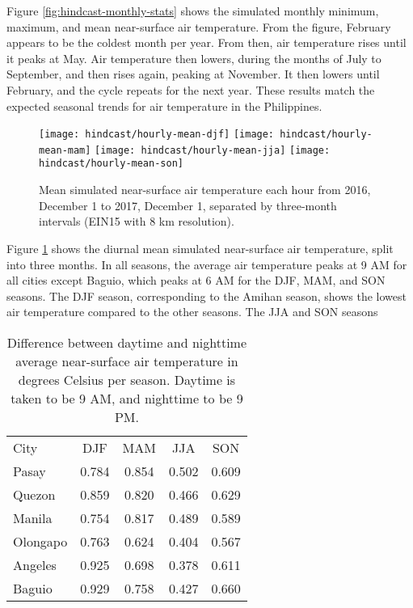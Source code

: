		Figure \ref{fig:hindcast-monthly-stats} shows the simulated monthly minimum, maximum, and mean near-surface air temperature.
		From the figure, February appears to be the coldest month per year.
		From then, air temperature rises until it peaks at May.
		Air temperature then lowers, during the months of July to September,
			and then rises again, peaking at November.
		It then lowers until February, and the cycle repeats for the next year.
		These results match the expected seasonal trends for air temperature in the Philippines.
	
		\begin{figure}	
			\centering
			\texttt{[image: hindcast/hourly-mean-djf]}
			\texttt{[image: hindcast/hourly-mean-mam]}
			\texttt{[image: hindcast/hourly-mean-jja]}
			\texttt{[image: hindcast/hourly-mean-son]}
			\caption{
				Mean simulated near-surface air temperature each hour from 2016, December 1 to 2017, December 1, separated by three-month intervals (EIN15 with 8 km resolution).
			}
			\label{fig:hindcast-hourly-mean}
		\end{figure}
	
		Figure \ref{fig:hindcast-hourly-mean} shows the diurnal mean simulated near-surface air temperature, split into three months.
		In all seasons, the average air temperature peaks at 9 AM for all cities except Baguio, which peaks at 6 AM for the DJF, MAM, and SON seasons.
		The DJF season, corresponding to the Amihan season, shows the lowest air temperature compared to the other seasons.
		The JJA and SON seasons
		
		\begin{table}[]
			\caption{
				Difference between daytime and nighttime average near-surface air temperature in degrees Celsius per season. 
				Daytime is taken to be 9 AM, and nighttime to be 9 PM.
			}
			\label{tab:hindcast-difference-day-night}
			\centering
			\begin{tabular}{lSSSS}
				City & {DJF} & {MAM} & {JJA} & {SON} \\
				Pasay    & 0.784                    & 0.854                    & 0.502                    & 0.609                    \\
				Quezon   & 0.859                    & 0.820                    & 0.466                    & 0.629                    \\
				Manila   & 0.754                    & 0.817                    & 0.489                    & 0.589                    \\
				Olongapo & 0.763                    & 0.624                    & 0.404                    & 0.567                    \\
				Angeles  & 0.925                    & 0.698                    & 0.378                    & 0.611                    \\
				Baguio   & 0.929                    & 0.758                    & 0.427                    & 0.660                   
			\end{tabular}
		\end{table}
		
